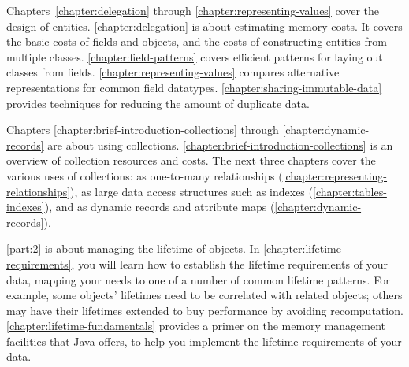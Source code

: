 Chapters~\ref{chapter:delegation} through
\ref{chapter:representing-values} cover the design of
entities. \autoref{chapter:delegation} is about estimating memory costs. It covers the basic costs of fields
and objects, and the costs of constructing entities from multiple classes.
\autoref{chapter:field-patterns} covers efficient patterns for laying out classes from fields.
\autoref{chapter:representing-values} compares alternative representations for common field datatypes. 
\autoref{chapter:sharing-immutable-data} provides techniques for
reducing the amount of duplicate data.

Chapters \ref{chapter:brief-introduction-collections} through
\ref{chapter:dynamic-records} are about
using collections. \autoref{chapter:brief-introduction-collections} is
an overview of collection resources and costs.
The next three chapters cover the various uses of collections:
as one-to-many relationships (\autoref{chapter:representing-relationships}),
as large data access structures such as indexes
(\autoref{chapter:tables-indexes}), and as dynamic records and attribute maps
(\autoref{chapter:dynamic-records}).

\begin{comment}
[NMM 20120628 too much E-C diagram detail for intro?]
A data model implementation begins with a conceptual understanding of the
entities and relationships in the model.  This may be an informal understanding,
or it may be formalized in a diagram such as an E-R diagram or a UML class
diagram.  At some point that conceptual model is turned into Java classes that
represent the entities, attributes, and assocations of the model, as well as any
auxiliary structures, such as indexes, needed to access the data.  The example
below shows a simple conceptual model, using a UML class diagram.  A Java
implementation of that model is also shown, using rectangles for classes and
arrows for references.  %
in that it shows
\end{comment}


\autoref{part:2} is about managing the lifetime of objects. In
\autoref{chapter:lifetime-requirements}, you will learn how to establish the
lifetime requirements of your data, mapping your needs to one of a number
of common lifetime patterns.
For example, some objects' lifetimes need to be correlated with
related objects; others may have their lifetimes extended to buy
performance by avoiding recomputation.
\autoref{chapter:lifetime-fundamentals} provides a primer on the memory
management facilities that Java offers, to help you implement the lifetime
requirements of your data.

